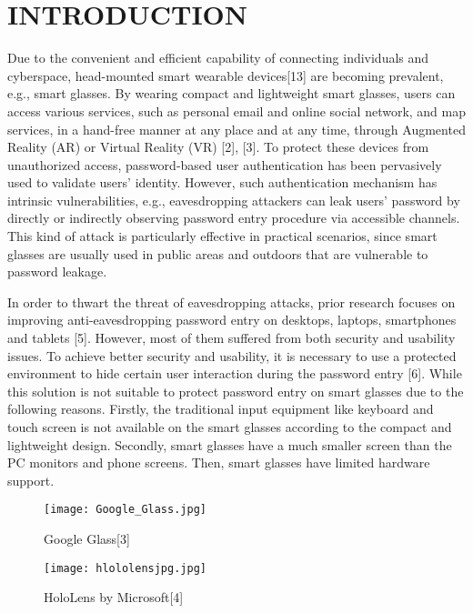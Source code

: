 \documentclass[12pt,a4paper,oneside]{report}
\begin{document}
\chapter{INTRODUCTION}
\label{intro}

\par
Due to the convenient and efficient capability of connecting individuals and cyberspace, head-mounted smart
wearable devices[13] are becoming prevalent, e.g., smart glasses.
By wearing compact and lightweight smart glasses, users can
access various services, such as personal email and online
social network, and map services, in a hand-free manner at
any place and at any time, through Augmented Reality (AR)
or Virtual Reality (VR) [2], [3]. To protect these devices from
unauthorized access, password-based user authentication has
been pervasively used to validate users’ identity. However,
such authentication mechanism has intrinsic vulnerabilities,
e.g., eavesdropping attackers can leak users’ password by
directly or indirectly observing password entry procedure via
accessible channels. This kind of attack is particularly effective
in practical scenarios, since smart glasses are usually used
in public areas and outdoors that are vulnerable to password
leakage.
\par
In order to thwart the threat of eavesdropping attacks, prior
research focuses on improving anti-eavesdropping password 
entry on desktops, laptops, smartphones and tablets [5].
However, most of them suffered from both security and usability issues. To achieve better security and
usability, it is necessary to use a protected environment to
hide certain user interaction during the password entry [6]. While this solution is not suitable to protect password
entry on smart glasses due to the following reasons. Firstly,
the traditional input equipment like keyboard and touch screen
is not available on the smart glasses according to the compact
and lightweight design. Secondly, smart glasses have a much
smaller screen than the PC monitors and phone screens. Then,
smart glasses have limited hardware support.
\par



\begin{figure}[H]
    \begin{center}
        \label{abc}
            \texttt{[image: Google\_Glass.jpg]}
            \caption{Google Glass[3]}
    \end{center}
\end{figure}
\begin{figure}[H]
    \begin{center}
        \label{abc}
            \texttt{[image: hlololensjpg.jpg]}
            \caption{HoloLens by Microsoft[4]}
    \end{center}
\end{figure}
\end{document}

